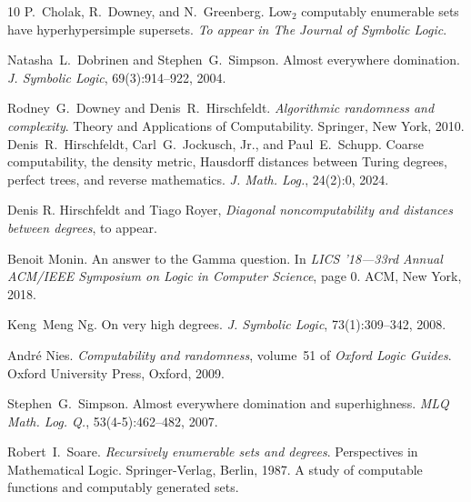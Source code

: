 \documentclass[11pt]{amsart}
\begin{document}
\begin{thebibliography}{10}
  P.~Cholak, R.~Downey, and  N.~Greenberg.
  {\newblock}Low{$_2$} computably enumerable sets have hyperhypersimple
  supersets. {\newblock}\textit{To appear in The Journal of Symbolic
  Logic}.{\newblock}
  
  Natasha~L.~Dobrinen  and  Stephen~G.~Simpson.
  {\newblock}Almost everywhere domination. {\newblock}\textit{J. Symbolic
  Logic}, 69(3):914--922, 2004.{\newblock}
  
  Rodney~G.~Downey  and  Denis~R.~Hirschfeldt.
  {\newblock}\textit{Algorithmic randomness and complexity}.
  {\newblock}Theory and Applications of Computability. Springer, New York,
  2010.{\newblock}
  Denis~R.~Hirschfeldt, Carl~G.~Jockusch, Jr., and 
  Paul~E.~Schupp. {\newblock}Coarse computability, the density metric,
  Hausdorff distances between Turing degrees, perfect trees, and reverse
  mathematics. {\newblock}\textit{J. Math. Log.}, 24(2):0, 2024.{\newblock}

Denis R. Hirschfeldt and Tiago Royer,
\emph{Diagonal noncomputability and distances between degrees},
to appear.
  
  Benoit Monin. {\newblock}An answer to the Gamma
  question. {\newblock}In \textit{LICS '18---33rd Annual ACM/IEEE Symposium
  on Logic in Computer Science},  page  0. ACM, New York, 2018.{\newblock}
  
  Keng~Meng Ng. {\newblock}On very high degrees.
  {\newblock}\textit{J. Symbolic Logic}, 73(1):309--342, 2008.{\newblock}
  
  Andr{\'e} Nies. {\newblock}\textit{Computability
  and randomness},  volume~51  of \textit{Oxford Logic Guides}.
  {\newblock}Oxford University Press, Oxford, 2009.{\newblock}
  
  Stephen~G.~Simpson. {\newblock}Almost everywhere
  domination and superhighness. {\newblock}\textit{MLQ Math. Log. Q.},
  53(4-5):462--482, 2007.{\newblock}
  
  Robert~I.~Soare. {\newblock}\textit{Recursively
  enumerable sets and degrees}. {\newblock}Perspectives in Mathematical Logic.
  Springer-Verlag, Berlin, 1987. {\newblock}A study of computable functions
  and computably generated sets.{\newblock}
\end{thebibliography}
\end{document}
